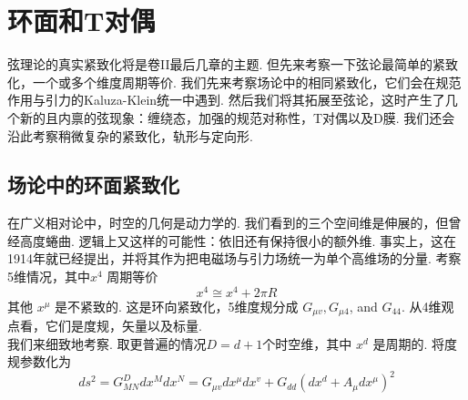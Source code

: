 
\chapter{环面和T对偶} \label{cha:8}
弦理论的真实紧致化将是卷II最后几章的主题. 但先来考察一下弦论最简单的紧致化，一个或多个维度周期等价. 我们先来考察场论中的相同紧致化，它们会在规范作用与引力的Kaluza-Klein统一中遇到. 然后我们将其拓展至弦论，这时产生了几个新的且内禀的弦现象：缠绕态，加强的规范对称性，T对偶以及D膜. 我们还会沿此考察稍微复杂的紧致化，轨形与定向形.

\section{场论中的环面紧致化}
在广义相对论中，时空的几何是动力学的. 我们看到的三个空间维是伸展的，但曾经高度蜷曲. 逻辑上又这样的可能性：依旧还有保持很小的额外维. 事实上，这在1914年就已经提出，并将其作为把电磁场与引力场统一为单个高维场的分量. 考察5维情况，其中$x^{4}$ 周期等价
\begin{equation}
	x^{4} \cong x^{4}+2 \pi R
\end{equation}
其他 $x^{\mu}$ 是不紧致的. 这是环向紧致化，5维度规分成 $G_{\mu v}, G_{\mu 4}$, and $G_{44} $. 从4维观点看，它们是度规，矢量以及标量.\\
我们来细致地考察. 取更普遍的情况$D=d+1$个时空维，其中 $x^{d}$ 是周期的. 将度规参数化为
\begin{equation}
	d s^{2}=G_{M N}^{D} d x^{M} d x^{N}=G_{\mu v} d x^{\mu} d x^{v}+G_{d d}\left(d x^{d}+A_{\mu} d x^{\mu}\right)^{2}
\end{equation}

